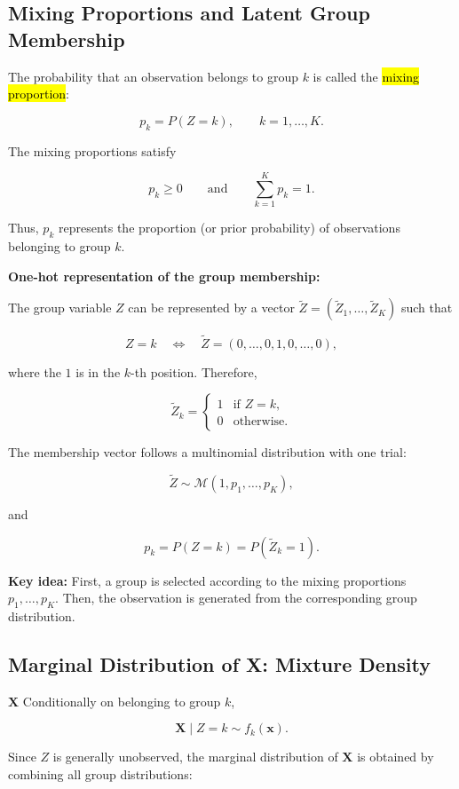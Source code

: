 \subsection{Mixing Proportions and Latent Group Membership}

The probability that an observation belongs to group $k$ is called the
\hl{mixing proportion}:

$$
p_k=P(Z=k),
\qquad k=1,\ldots,K.
$$

The mixing proportions satisfy

$$
p_k\geq 0
\qquad\text{and}\qquad
\sum_{k=1}^K p_k=1.
$$

Thus, $p_k$ represents the proportion (or prior probability) of observations
belonging to group $k$.

\medskip

\textbf{One-hot representation of the group membership:}

The group variable $Z$ can be represented by a vector
$\tilde{Z}=(\tilde{Z}_1,\ldots,\tilde{Z}_K)$ such that

$$
Z=k
\quad\Longleftrightarrow\quad
\tilde{Z}=(0,\ldots,0,1,0,\ldots,0),
$$

where the $1$ is in the $k$-th position. Therefore,

$$
\tilde{Z}_k=
\begin{cases}
1 & \text{if } Z=k,\\
0 & \text{otherwise.}
\end{cases}
$$

The membership vector follows a multinomial distribution with one trial:

$$
\tilde{Z}\sim\mathcal{M}(1,p_1,\ldots,p_K),
$$

and

$$
p_k=P(Z=k)=P(\tilde{Z}_k=1).
$$

\textbf{Key idea:} First, a group is selected according to the mixing
proportions $p_1,\ldots,p_K$. Then, the observation is generated from the
corresponding group distribution.

\subsection{Marginal Distribution of X: Mixture Density}
$\bm{X}$
Conditionally on belonging to group $k$,

$$
\bm{X}\mid Z=k\sim f_k(\mathbf{x}).
$$

Since $Z$ is generally unobserved, the marginal distribution of $\bm{X}$ is
obtained by combining all group distributions:

